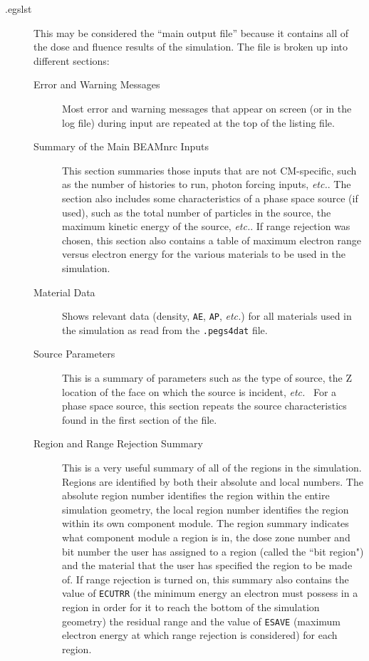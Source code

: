 \documentclass[12pt,twoside]{article}
\newcommand{\etc}{{\em etc.}}
\begin{document}
\begin{description}

\item [.egslst]
      This may be considered the ``main output file'' because it contains all of
the dose and fluence results of the simulation.  The file is broken up
into different sections:

\begin{description}

\item [Error and Warning Messages]
  

Most error and warning messages that appear on screen (or in the log
file) during input are repeated at the top of the listing file.

\item [Summary of the Main BEAMnrc Inputs]
 This section summaries those inputs that are not CM-specific, such as the
number of histories to run, photon forcing inputs, \etc.  The
section also includes some characteristics of a phase space source (if
used), such as
the total number of particles in the source, the maximum kinetic energy of the
source, \etc.  If range rejection was chosen, this section also contains a table
of maximum electron range versus electron energy for the various materials to
be used in the simulation.

\item [Material Data]
Shows relevant data (density, \verb+AE+, \verb+AP+, \etc) for all materials used
in the simulation as read from the \verb+.pegs4dat+ file.

\item [Source Parameters]
 This is a summary of parameters such as the type of source, the Z location of
the face on which the source is incident, \etc~  For a phase space source, this
section repeats the source characteristics found in the first section of the
file.

\item [Region and Range Rejection Summary]
This is a very useful summary of all of the regions in the simulation.  Regions are identified by both their absolute and local numbers.  The absolute
region number identifies the region within the entire simulation
geometry, the local region number identifies the region within its own
component module.  The region summary indicates what component module a
region is in, the dose zone number and bit number
the user has assigned to a region (called the ``bit region")
and the material that the user has
specified the region to be made of.  If range rejection is turned on,
this summary also contains the value of \verb+ECUTRR+ (the minimum energy an
electron must possess in a region in order for it
to reach the bottom of the simulation geometry) the residual
range and the value of \verb+ESAVE+ (maximum electron energy at which range
rejection is considered) for each region.


\end{description}
\end{description}
\end{document}
